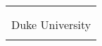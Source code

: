 \documentclass[11pt]{amsart}
\begin{document}
\begin{center}
\begin{tabular}{c}
\begin{minipage}{\textwidth}
		{\bf Teaching Assistant} \hfill {\bf 08/2016 to Present}\\
		{Georgia Institute of Technology\\Duke University}\\
		

\end{minipage}
\end{tabular}
\end{center}
\end{document}
